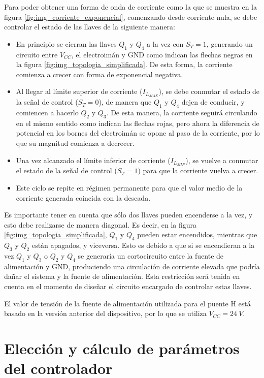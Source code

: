 Para poder obtener una forma de onda de corriente como la que se muestra en la figura \ref{fig:img_corriente_exponencial}, comenzando desde corriente nula, se debe controlar el estado de las llaves de la siguiente manera:


\begin{itemize}
	\item En principio se cierran las llaves $Q_1$ y $Q_4$ a la vez con $S_T=1$, generando un circuito entre $V_{CC}$, el electroimán y GND como indican las flechas negras en la figura \ref{fig:img_topologia_simplificada}. De esta forma, la corriente comienza a crecer con forma de exponencial negativa.
	\item Al llegar al límite superior de corriente ($I_{L_{MAX}}$), se debe conmutar el estado de la señal de control ($S_T=0$), de manera que $Q_1$ y $Q_4$ dejen de conducir, y comiencen a hacerlo $Q_2$ y $Q_3$. De esta manera, la corriente seguirá circulando en el mismo sentido como indican las flechas rojas, pero ahora la diferencia de potencial en los bornes del electroimán se opone al paso de la corriente, por lo que su magnitud comienza a decrecer.
	\item Una vez alcanzado el límite inferior de corriente ($I_{L_{MIN}}$), se vuelve a conmutar el estado de la señal de control ($S_T=1$) para que la corriente vuelva a crecer.
	\item Este ciclo se repite en régimen permanente para que el valor medio de la corriente generada coincida con la deseada. 
\end{itemize}

Es importante tener en cuenta que sólo dos llaves pueden encenderse a la vez, y esto debe realizarse de manera diagonal. Es decir, en la figura \ref{fig:img_topologia_simplificada}, $Q_1$ y $Q_4$ pueden estar encendidos, mientras que $Q_3$ y $Q_2$ están apagados, y viceversa. Esto es debido a que si se encendieran a la vez  $Q_1$ y $Q_3$ o  $Q_2$ y $Q_4$ se generaría un cortocircuito entre la fuente de alimentación y GND, produciendo una circulación de corriente elevada que podría dañar el sistema y la fuente de alimentación. Esta restricción será tenida en cuenta en el momento de diseñar el circuito encargado de controlar estas llaves.

El valor de tensión de la fuente de alimentación utilizada para el puente H está basado en la versión anterior del dispositivo, por lo que se utiliza $V_{CC} = 24\:V$.

\section{Elección y cálculo de parámetros del controlador}

